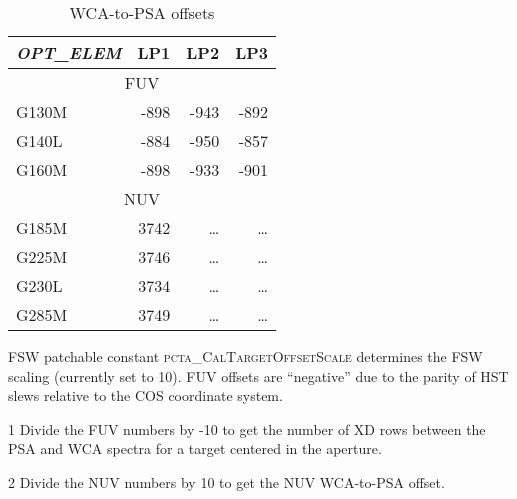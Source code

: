 \begin{table}
\centering
	\begin{threeparttable}[tbc]
	\caption{ WCA-to-PSA offsets}
	\begin{tabular*}{.8\linewidth}{@{\extracolsep{\fill}}lrrr}
		\toprule
		\textit{OPT\_ELEM} &	LP1	&	LP2	&	LP3	\\
		\midrule
		\multicolumn{4}{c}{FUV\tnote{1}}\\
		\midrule
		G130M	&	 -898	&	-943	&	-892 \\
		G140L	&	 -884	&	-950	&	-857 \\
		G160M	&	 -898	&	-933	&	-901 \\
		\midrule
		\multicolumn{4}{c}{NUV\tnote{2}}\\
		\midrule
		G185M	&	3742	&	\dots	&	\dots \\
		G225M	&	3746	&	\dots	&	\dots \\
		G230L	&	3734	&	\dots	&	\dots \\
		G285M	&	3749	&	\dots	&	\dots \\
		\bottomrule
	\end{tabular*}
	\scriptsize
		\begin{tablenotes}
			\item[] {FSW patchable constant \textsc{pcta\_CalTargetOffsetScale} determines the FSW scaling (currently set to 10). FUV offsets are ``negative'' due to the parity of HST slews relative to the COS coordinate system.\\}
			\item[1] {Divide the FUV numbers by -10 to get the number of XD rows between the PSA and WCA spectra for a target centered in the aperture.}
			\item[2] {Divide the NUV numbers by 10 to get the NUV WCA-to-PSA offset. }
		\end{tablenotes}
	\label{tab:wcatopsa}
	\normalsize
	\end{threeparttable}
\end{table}

